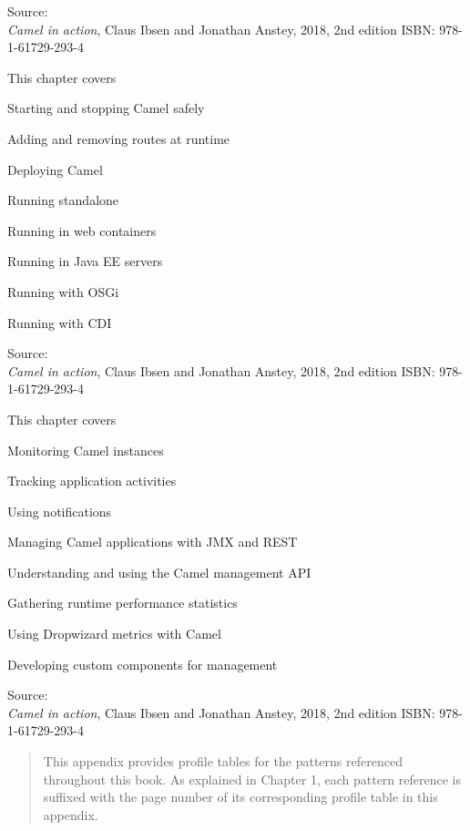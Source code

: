 \documentclass[Screen16to9,17pt]{foils}
\begin{document}
Source: {\footnotesize\\
\emph{Camel in action}, Claus Ibsen and Jonathan Anstey, 2018, 2nd edition
ISBN: 978-1-61729-293-4}


This chapter covers

\begin{list2}
\item Starting and stopping Camel safely
\item Adding and removing routes at runtime
\item Deploying Camel
\item Running standalone
\item Running in web containers
\item Running in Java EE servers
\item Running with OSGi
\item Running with CDI
\end{list2}

Source: {\footnotesize\\
\emph{Camel in action}, Claus Ibsen and Jonathan Anstey, 2018, 2nd edition
ISBN: 978-1-61729-293-4}


This chapter covers
\begin{list2}
\item Monitoring Camel instances
\item Tracking application activities
\item Using notifications
\item Managing Camel applications with JMX and REST
\item Understanding and using the Camel management API
\item Gathering runtime performance statistics
\item Using Dropwizard metrics with Camel
\item Developing custom components for management
\end{list2}

Source: {\footnotesize\\
\emph{Camel in action}, Claus Ibsen and Jonathan Anstey, 2018, 2nd edition
ISBN: 978-1-61729-293-4}




\begin{quote}
This appendix provides profile tables for the patterns referenced throughout this
book. As explained in Chapter 1, each pattern reference is suffixed with the page
number of its corresponding profile table in this appendix.
\end{quote}
\end{document}
